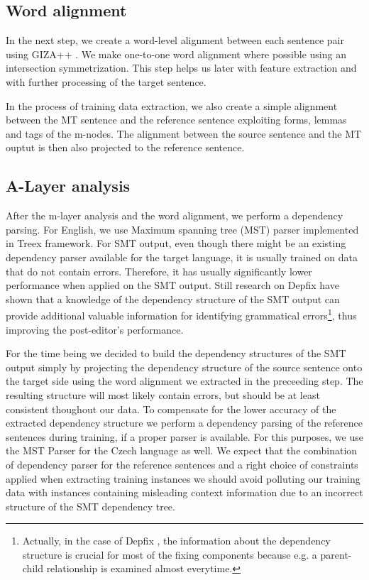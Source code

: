 \subsection{Word alignment}

In the next step, we create a word-level alignment between each sentence pair
using GIZA++ \citep{och:ney:2000}. We make one-to-one word alignment where possible
using an intersection symmetrization. This step helps us later with feature extraction
and with further processing of the target sentence.

In the process of training data extraction, we also create a simple alignment between
the MT sentence and the reference sentence exploiting forms, lemmas and tags
of the m-nodes. The alignment between the source sentence and the MT ouptut is then also
projected to the reference sentence.

\subsection{A-Layer analysis}

After the m-layer analysis and the word alignment, we perform a dependency parsing.
For English, we use Maximum spanning tree (MST) parser \citep{mcdonald:pereira:ribarov:hajic:2005}
implemented in Treex framework. For SMT output, even though there might
be an existing dependency parser available for the target language, it is usually
trained on data that do not contain errors. Therefore, it has usually significantly
lower performance when applied on the SMT output. Still research on Depfix have shown
that a knowledge of the dependency structure of the SMT output can provide additional
valuable information for identifying grammatical errors\footnote{Actually, in the case of Depfix
, the information about the dependency structure is crucial for most of the fixing components
because e.g. a parent-child relationship is examined almost everytime.}, thus improving
the post-editor's performance.

For the time being we decided to build the dependency structures of the SMT output simply
by projecting the dependency structure of the source sentence onto the target side
using the word alignment we extracted in the preceeding step. The resulting structure
will most likely contain errors, but should be at least consistent thoughout our data.
To compensate for the lower accuracy of the extracted dependency structure we perform
a dependency parsing of the reference sentences during training, if a proper parser
is available. For this purposes, we use the MST Parser for the Czech language as well.
We expect that the combination of dependency parser for the reference sentences and
a right choice of constraints applied when extracting training instances we should
avoid polluting our training data with instances containing misleading context information
due to an incorrect structure of the SMT dependency tree.

